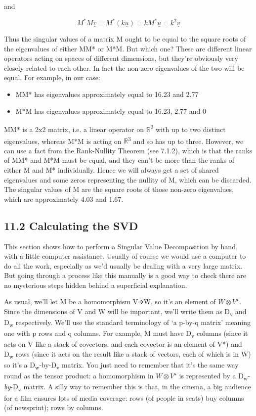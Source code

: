 \documentclass[oneside,english]{amsbook}
\numberwithin{section}{chapter}
\theoremstyle{plain}
\theoremstyle{definition}
\begin{document}
and

\[{M^{*}M\underline{v} = M^{*}\left( k\underline{u} \right)
}{= kM^{*}\underline{u}
}{= k^{2}\underline{v}}\]

Thus the singular values of a matrix M ought to be equal to the square
roots of the eigenvalues of either MM* or M*M. But which one? These are
different linear operators acting on spaces of different dimensions, but
they're obviously very closely related to each other. In fact the
non-zero eigenvalues of the two will be equal. For example, in our case:

\begin{itemize}
	\item
	MM* has eigenvalues approximately equal to 16.23 and 2.77
	\item
	M*M has eigenvalues approximately equal to 16.23, 2.77 and 0
\end{itemize}

MM* is a 2x2 matrix, i.e. a linear operator on
$\mathbb{R}$\textsuperscript{2} with up to two distinct eigenvalues,
whereas M*M is acting on $\mathbb{R}$\textsuperscript{3} and so has up to
three. However, we can use a fact from the Rank-Nullity Theorem (see
7.1.2), which is that the ranks of MM* and M*M must be equal, and they
can't be more than the ranks of either M and M* individually. Hence we
will always get a set of shared eigenvalues and some zeros representing
the nullity of M, which can be discarded. The singular values of M are
the square roots of those non-zero eigenvalues, which are approximately
4.03 and 1.67.

\subsection{11.2 Calculating the SVD}\label{calculating-the-svd}

This section shows how to perform a Singular Value Decomposition by
hand, with a little computer assistance. Usually of course we would use
a computer to do all the work, especially as we'd usually be dealing
with a very large matrix. But going through a process like this manually
is a good way to check there are no mysterious steps hidden behind a
superficial explanation.

As usual, we'll let M be a homomorphism V🡪W, so it's an element of $W\otimes V^\star$.
Since the dimensions of V and W will be important, we'll write them as
D\textsubscript{v} and D\textsubscript{w} respectively. We'll use the
standard terminology of `a p-by-q matrix' meaning one with p rows and
q columns. For example, M must have D\textsubscript{v} columns (since it
acts on V like a stack of covectors, and each covector is an element of
V*) and D\textsubscript{w} rows (since it acts on the result like a
stack of vectors, each of which is in W) so it's a
D\textsubscript{w}-by-D\textsubscript{v} matrix. You just need to
remember that it's the same way round as the tensor product: a
homomorphism in $W\otimes V^\star$ is represented by a
D\textsubscript{w}-\emph{by}-D\textsubscript{v} matrix. A silly way to
remember this is that, in the cinema, a big audience for a film ensures
lots of media coverage: rows (of people in seats) buy columns (of
newsprint); rows by columns.
\end{document}
